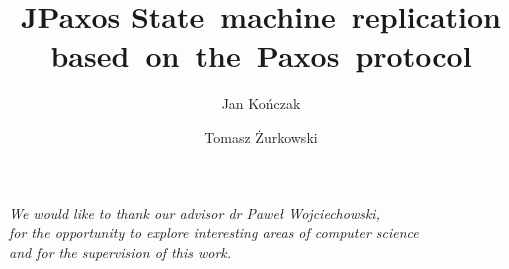 \documentclass[english,bachelor,a4paper,oneside,12pt]{ppfcmthesis}
\author{%
   Jan Kończak \album{84822} \and 
   Tomasz Żurkowski \album{84915}}
\title{{\Huge JPaxos} \hspace{5em} State~machine~replication based~on~the~Paxos~protocol}
\begin{document}
\frontmatter\pagestyle{empty}%
\maketitle\cleardoublepage%

\thispagestyle{empty}\vspace*{\fill}%
\begin{center}\strut\end{center}%
\vfill\cleardoublepage%

\thispagestyle{empty}\vspace*{\fill}
\vspace{10cm}
\begin{flushright}\large\textit{We would like to thank our advisor dr Pawe\l{}
Wojciechowski,\\ for the opportunity to explore interesting areas of computer
science\\ and for the supervision of this work.}\end{flushright}%
\vfill\cleardoublepage


\pagestyle{ppfcmthesis}%
\vspace*{-4em} \tableofcontents* \cleardoublepage%


\mainmatter%








\cleardoublepage\appendix%
\setcounter{pageTemp}{\value{page}}

\setcounter{page}{1}


\clearpage

\setcounter{page}{\value{pageTemp}}

{\raggedright\sloppy\small}

\ppcolophon
\end{document}
